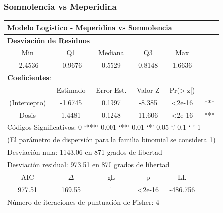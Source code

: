\documentclass[10pt]{beamer}
\begin{document}
	
	\begin{frame}
		\frametitle{Somnolencia vs Meperidina}
		
		\begin{table}[]
		\centering
		\small
		\begin{tabular}{|c|c|c|c|c|c|}
			\hline
			\multicolumn{6}{|l|}{\textbf{Modelo Logístico - Meperidina vs Somnolencia}}                    \\ \hline
			\multicolumn{6}{|l|}{\textbf{{Desviación de Residuos}}}                                        \\ \hline
			    Min      &    Q1    &  Mediana   &        Q3        &          Max          &              \\ \hline
			  -2.4536    & -0.9676  &   0.5529   &      0.8148      &        1.6636         &              \\ \hline
			\multicolumn{6}{|l|}{\textbf{Coeficientes}:}                                                   \\ \hline
			             & Estimado & Error Est. &     Valor Z      & Pr(\textgreater{}|z|) &              \\ \hline
			(Intercepto) & -1.6745  &   0.1997   &      -8.385      &   \textless{}2e-16    &     ***      \\ \hline
			   Dosis     &  1.4481  &   0.1248   &      11.606      &   \textless{}2e-16    &     ***      \\ \hline
			\multicolumn{6}{|l|}{Códigos Significativos:  0 ‘***’ 0.001 ‘**’ 0.01 ‘*’  0.05 ‘.’ 0.1 ‘ ’ 1} \\ \hline
			\multicolumn{6}{|l|}{(El parámetro de dispersión para la familia binomial se considera 1)}     \\ \hline
			\multicolumn{6}{|l|}{Desviación nula: 1143.06 en 871 grados de libertad}                       \\ \hline
			\multicolumn{6}{|l|}{Desviación residual: 973.51 en 870 grados de libertad}                    \\ \hline
			    AIC      & $\Delta$ &     gL     &        p         &          LL           &              \\ \hline
			   977.51    &  169.55  &     1      & \textless{}2e-16 &       -486.756        &              \\ \hline
			\multicolumn{6}{|l|}{Número de iteraciones de puntuación de Fisher: 4}                         \\ \hline
		\end{tabular}
		\end{table}
	\end{frame}
	
\end{document}
